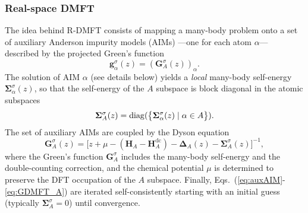 \documentclass[aps,prx,twocolumn,superscriptaddress]{revtex4-2}
\begin{document}
\subsubsection{Real-space DMFT}
The idea behind R-DMFT consists of mapping a many-body problem onto a set of auxiliary Anderson impurity models (AIMs) ---one for each atom $\alpha$--- described by the projected Green's function~\cite{snoekNJP10,valliPRL104,valliPRB82}
\begin{equation} \label{eq:auxAIM}
    \mathbf{g}^{\sigma}_{\alpha}(z) = \left( \mathbf{G}^{\sigma}_A(z) \right)_\alpha.
\end{equation}
The solution of AIM $\alpha$ (see details below) yields a \emph{local} many-body self-energy $\mathbf{\Sigma}^{\sigma}_{\alpha}(z)$, so that the self-energy of the $A$ subspace is block diagonal in the atomic subspaces   
\begin{equation} \label{eq:SigmaDMFT_A}
    \mathbf{\Sigma}^{\sigma}_{A}(z) = \mathrm{diag}(\qty\big{\mathbf{\Sigma}^{\sigma}_{\alpha}(z) \mid \alpha \in A}).
\end{equation}
The set of auxiliary AIMs are coupled by the Dyson equation
\begin{equation} \label{eq:GDMFT_A}
    \mathbf{G}^{\sigma}_A(z) = \big[ z + \mu - (\mathbf{H}_A - \mathbf{H}^{\mathrm{dc}}_A) 
                             - \mathbf{\Delta}_A(z) - \mathbf{\Sigma}^{\sigma}_A(z) \big]^{-1},
\end{equation}
where the Green's function $\mathbf{G}^{\sigma}_A$ includes the many-body self-energy and the double-counting correction, 
and the chemical potential $\mu$ is determined to preserve the DFT occupation of the $A$ subspace. 
Finally, Eqs.~(\ref{eq:auxAIM}-\ref{eq:GDMFT_A}) are iterated self-consistently starting with an initial guess (typically $\mathbf{\Sigma}^{\sigma}_{A}=0$) until convergence. 
\end{document}
